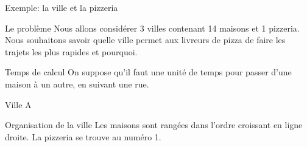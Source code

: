 \documentclass[10pt,xcolor=dvipsnames]{beamer}
\begin{document}
\begin{frame}{Exemple: la ville et la pizzeria}

    \begin{exampleblock}{Le problème}
    Nous allons considérer 3 villes contenant 14 maisons et 1 pizzeria. Nous souhaitons savoir quelle ville permet aux livreurs de pizza de faire les trajets les plus rapides et pourquoi.
    \end{exampleblock}

    \begin{alertblock}{Temps de calcul}
    On suppose qu'il faut une \alert{unité de temps} pour passer d'une maison à un autre, en suivant une rue.
    \end{alertblock}
    \begin{center}
    \end{center}
\end{frame}


\begin{frame}{Ville A}
\begin{exampleblock}{Organisation de la ville}
Les maisons sont rangées dans l'ordre croissant en ligne droite. La pizzeria se trouve au numéro 1.
\end{exampleblock}
    
\end{frame}
\end{document}
